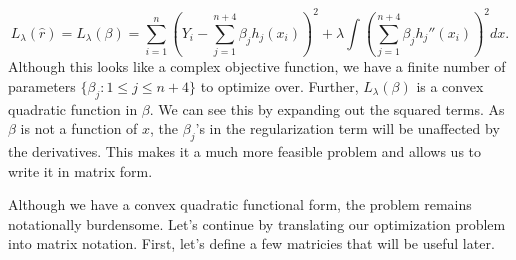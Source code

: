 \begin{equation*}
    L_\lambda(\hat{r}) = L_\lambda(\beta) = \sum_{i=1}^n \left( Y_i - \sum_{j=1}^{n+4} \beta_j h_j(x_i) \right)^2 + \lambda \int \left( \sum_{j=1}^{n+4} \beta_j h_j''(x_i)\right)^2dx.
\end{equation*}
Although this looks like a complex objective function, we have a finite number of parameters $\{\beta_j : 1 \leq j \leq n + 4\}$ to optimize over. Further, $L_\lambda(\beta)$ is a convex quadratic function in $\beta$. We can see this by expanding out the squared terms. As $\beta$ is not a function of $x$, the $\beta_j$'s in the regularization term will be unaffected by the derivatives. This makes it a much more feasible problem and allows us to write it in matrix form.

Although we have a convex quadratic functional form, the problem remains notationally burdensome. Let's continue by translating our optimization problem into matrix notation. First, let's define a few matricies that will be useful later.

